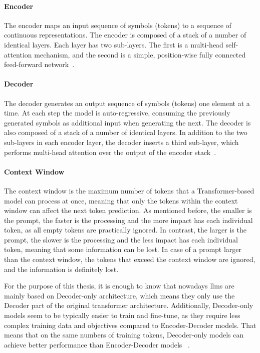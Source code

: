 \paragraph{Encoder} The encoder maps an input sequence of symbols (tokens) to a
sequence of continuous representations. The encoder is composed of a stack of a
number of identical layers. Each layer has two sub-layers. The first is a
multi-head self-attention mechanism, and the second is a simple, position-wise
fully connected feed-forward network~\cite{attention}.

\paragraph{Decoder} The decoder generates an output sequence of symbols
(tokens) one element at a time. At each step the model is auto-regressive,
consuming the previously generated symbols as additional input when generating
the next. The decoder is also composed of a stack of a number of identical
layers. In addition to the two sub-layers in each encoder layer, the decoder
inserts a third sub-layer, which performs multi-head attention over the output
of the encoder stack~\cite{attention}.

\paragraph{Context Window}\label{p:context-window} The context window is the
maximum number of tokens that a Transformer-based model can process at once,
meaning that only the tokens within the context window can affect the next token
prediction. As mentioned before, the smaller is the prompt, the faster is the
processing and the more impact has each individual token, as all empty tokens
are practically ignored. In contrast, the larger is the prompt, the slower is
the processing and the less impact has each individual token, meaning that some
information can be lost. In case of a prompt larger than the context window, the
tokens that exceed the context window are ignored, and the information is
definitely lost.

For the purpose of this thesis, it is enough to know that nowadays \glspl{llm}
are mainly based on Decoder-only architecture, which means they only use the
Decoder part of the original transformer architecture. Additionally,
Decoder-only models seem to be typically easier to train and fine-tune, as they
require less complex training data and objectives compared to Encoder-Decoder
models. That means that on the same numbers of training tokens, Decoder-only
models can achieve better performance than Encoder-Decoder models
~\cite{zhao2023,wei2023chainofthoughtpromptingelicitsreasoning}.

